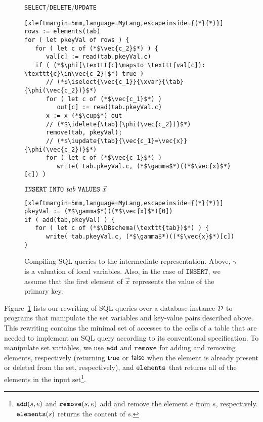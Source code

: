 \begin{figure}[t]
\centering
\small
\begin{minipage}{6cm}
\begin{flushleft}
\texttt{SELECT}/\texttt{DELETE}/\texttt{UPDATE}
\end{flushleft}
\vspace{-2mm}
\begin{lstlisting}[xleftmargin=5mm,language=MyLang,escapeinside={(*}{*)}]
rows := elements(tab)
for ( let pkeyVal of rows ) {
   for ( let c of (*$\vec{c_2}$*) ) {
      val[c] := read(tab.pkeyVal.c)
   if ( (*$\phi[\texttt{c}\mapsto \texttt{val[c]}: \texttt{c}\in\vec{c_2}]$*) true )
      // (*$\iselect{\vec{c_1}}{\xvar}{\tab}{\phi(\vec{c_2})}$*)
      for ( let c of (*$\vec{c_1}$*) )
         out[c] := read(tab.pkeyVal.c)
      x := x (*$\cup$*) out
      // (*$\idelete{\tab}{\phi(\vec{c_2})}$*)
      remove(tab, pkeyVal);
      // (*$\iupdate{\tab}{\vec{c_1}=\vec{x}}{\phi(\vec{c_2})}$*)
      for ( let c of (*$\vec{c_1}$*) )
         write( tab.pkeyVal.c, (*$\gamma$*)((*$\vec{x}$*)[c]) )
\end{lstlisting}

\begin{flushleft}
$\mathtt{INSERT\ INTO}\ {\mathit{tab}}\ \mathtt{VALUES}\ {\vec{x}}$
\end{flushleft}
\vspace{-2mm}
\begin{lstlisting}[xleftmargin=5mm,language=MyLang,escapeinside={(*}{*)}]
pkeyVal := (*$\gamma$*)((*$\vec{x}$*)[0])
if ( add(tab,pkeyVal) ) {
   for ( let c of (*$\DBschema(\texttt{tab})$*) ) {
      write( tab.pkeyVal.c, (*$\gamma$*)((*$\vec{x}$*)[c]) )
\end{lstlisting}
\end{minipage}
\vspace{-4mm}
    \caption{Compiling SQL queries to the intermediate representation. Above, $\gamma$ is a valuation of local variables. Also, in the case of $\mathtt{INSERT}$, we assume that the first element of $\vec{x}$ represents the value of the primary key.}
    \label{fig:sql-ir}
\vspace{-3mm}
\end{figure}

Figure~\ref{fig:sql-ir} lists our rewriting of SQL queries over a database instance $\mathcal{D}$ to programs that manipulate the set variables and key-value pairs described above. This rewriting contains the minimal set of accesses to the cells of a table that are needed to implement an SQL query according to its conventional specification. To manipulate set variables, we use $\mathtt{add}$ and $\mathtt{remove}$ for adding and removing elements, respectively (returning $\mathsf{true}$ or $\mathsf{false}$ when the element is already present or deleted from the set, respectively), and $\mathtt{elements}$ that returns all of the elements in the input set\footnote{$\mathtt{add}(s,e)$ and $\mathtt{remove}(s,e)$ add and remove the element $e$ from $s$, respectively. $\mathtt{elements}(s)$ returns the content of $s$.}. 

